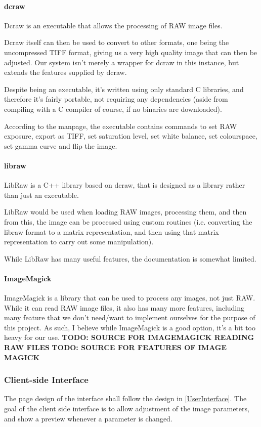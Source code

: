 \documentclass[12pt,a4paper]{article}
\begin{document}
\paragraph{dcraw}
Dcraw is an executable that allows the processing of RAW image files.

Dcraw itself can then be used to convert to other formats, one being the uncompressed TIFF format,
giving us a very high quality image that can then be adjusted. Our system isn't merely a wrapper for
dcraw in this instance, but extends the features supplied by dcraw.

Despite being an executable, it's written using only standard C libraries, and therefore it's
fairly portable, not requiring any dependencies (aside from compiling with a C compiler of course, if
no binaries are downloaded). \cite{DcrawWebsite}

According to the manpage, the executable contains commands to set RAW exposure, export as TIFF,
set saturation level, set white balance, set colourspace, set gamma curve and flip the image. \cite{DcrawManpage}


\paragraph{libraw}
LibRaw is a C++ library based on dcraw, that is designed as a library rather than just
an executable.

LibRaw would be used when loading RAW images, processing them, and then from this,
the image can be processed using custom routines (i.e. converting the libraw format
to a matrix representation, and then using that matrix representation to carry out
some manipulation).

While LibRaw has many useful features, the documentation is somewhat limited.

\paragraph{ImageMagick}
ImageMagick is a library that can be used to process any images, not just RAW. While it can read
RAW image files, it also has many more features, including many feature that we don't need/want to
implement ourselves for the purpose of this project. As such, I believe while ImageMagick is a good option,
it's a bit too heavy for our use.
\textbf{TODO: SOURCE FOR IMAGEMAGICK READING RAW FILES}
\textbf{TODO: SOURCE FOR FEATURES OF IMAGE MAGICK}

\subsubsection{Client-side Interface}
  The page design of the interface shall follow the design in \ref{UserInterface}.
  The goal of the client side interface is to allow adjustment of the image parameters,
  and show a preview whenever a parameter is changed.
\end{document}
